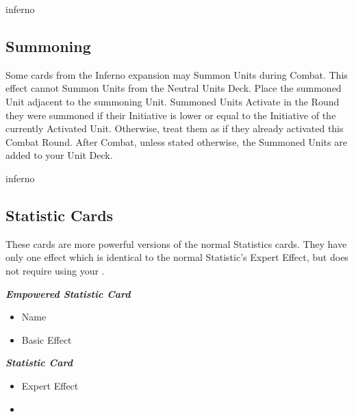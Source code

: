 \begin{multicols*}{2}
\begin{expansion}{inferno}
  \subsection*{Summoning}
  Some cards from the Inferno expansion may Summon Units during Combat.
  This effect cannot Summon Units from the Neutral Units Deck.
  Place the summoned Unit adjacent to the summoning Unit.
  Summoned Units Activate in the Round they were summoned if their Initiative is lower or equal to the Initiative of the currently Activated Unit.
  Otherwise, treat them as if they already activated this Combat Round.
  After Combat, unless stated otherwise, the Summoned Units are added to your Unit Deck.
\end{expansion}

\begin{expansion}{inferno}
  \subsection*{ Statistic Cards}
  These cards are more powerful versions of the normal Statistics cards.
  They have only one effect which is identical to the normal Statistic's Expert Effect, but does not require using your .

  \begin{scriptsize}
  \end{scriptsize}
  \vspace{-2em}
  \begin{multicols}{2}
    \centering
    \footnotesize
    \textbf{\textit{\textcolor{darkcandyapplered}{Empowered Statistic Card}}}
    \begin{itemize}
      \item[\textbf{1.}] Name
      \item[\textbf{2.}] Basic Effect
    \end{itemize}
    \columnbreak
    \textbf{\textit{\textcolor{darkcandyapplered}{Statistic Card \phantom{Empowered}}}}
    \begin{itemize}
      \item[\textbf{3.}] Expert Effect
      \item[\textbf{\phantom{.}}] \phantom{.}
    \end{itemize}
  \end{multicols}
\end{expansion}


\end{multicols*}
